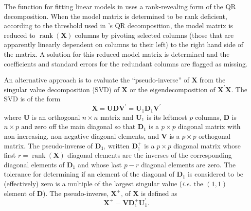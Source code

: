 \documentclass[shortnames,article,nojss]{jss}
\newcommand{\rank}{\operatorname{rank}}
\begin{document}
The  function for fitting linear models in  uses
a rank-revealing form of the QR decomposition.  When the model matrix
is determined to be rank deficient, according to the threshold used in
's QR decomposition, the model matrix is reduced to
$\rank{(\bm X)}$ columns by pivoting selected columns (those that are
apparently linearly dependent on columns to their left) to the right
hand side of the matrix.  A solution for this reduced model matrix is
determined and the coefficients and standard errors for the redundant
columns are flagged as missing.

An alternative approach is to evaluate the ``pseudo-inverse'' of $\bm
X$ from the singular value decomposition (SVD) of $\bm X$ or the
eigendecomposition of $\bm X^\prime\bm X$.  The SVD is of the form
\begin{displaymath}
  \bm X=\bm U\bm D\bm V^\prime=\bm U_1\bm D_1\bm V^\prime
\end{displaymath}
where $\bm U$ is an orthogonal $n\times n$ matrix and $\bm U_1$ is its
leftmost $p$ columns, $\bm D$ is $n\times p$ and zero off the main
diagonal so that $\bm D_1$ is a $p\times p$ diagonal matrix with
non-increasing, non-negative diagonal elements, and $\bm V$ is a $p\times
p$ orthogonal matrix.  The pseudo-inverse of $\bm D_1$, written $\bm
D_1^+$ is a $p\times p$ diagonal matrix whose first $r=\rank(\bm X)$
diagonal elements are the inverses of the corresponding diagonal
elements of $\bm D_1$ and whose last $p-r$ diagonal elements are zero.
The tolerance for determining if an element of the diagonal of $\bm D_1$
is considered to be (effectively) zero is a multiple of the largest
singular value (\textit{i.e.} the $(1,1)$ element of $\bm D$).
The pseudo-inverse, $\bm X^+$, of $\bm X$ is defined as
\begin{displaymath}
  \bm X^+=\bm V\bm D_1^+\bm U_1^\prime .
\end{displaymath}
\end{document}
